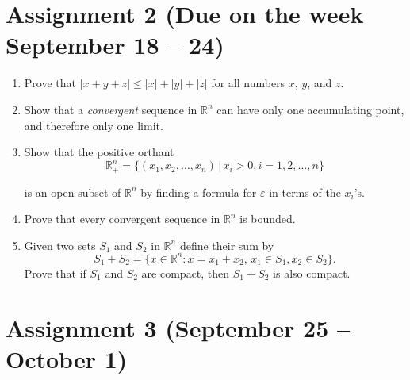 \documentclass[12pt]{article} %
\theoremstyle{definition} %
\begin{document}
\section{Assignment 2 (Due on the week September 18 – 24)}
\begin{enumerate}

\item Prove that $|x+y+z|\leqslant |x|+|y|+|z|$ for all numbers $x$, $y$, and $z$.

\item Show that a \textit{convergent} sequence in $\mathbb{R}^n$ can have only one accumulating point, and therefore only one limit.

\item Show that the positive orthant
\[
	\mathbb{R}^n_+=\{(x_1, x_2,\dots, x_n)\,|\, x_i>0, i=1,2,\dots, n\}
\]

is an open subset of $\mathbb{R}^n$ by finding a formula for $\varepsilon$ in terms of the $x_i$'s.

\item Prove that every convergent sequence in $\mathbb{R}^n$ is bounded.

\item Given two sets $S_1$ and $S_2$ in $\mathbb{R}^n$ define their sum by 
\[
	S_1+S_2=\{x\in \mathbb{R}^n\colon x=x_1+x_2,\, x_1\in S_1, x_2\in S_2\}.
\]
Prove that if $S_1$ and $S_2$ are compact, then $S_1+S_2$ is also compact.

\end{enumerate}



\section{Assignment 3 (September 25 – October 1)}
\end{document}

